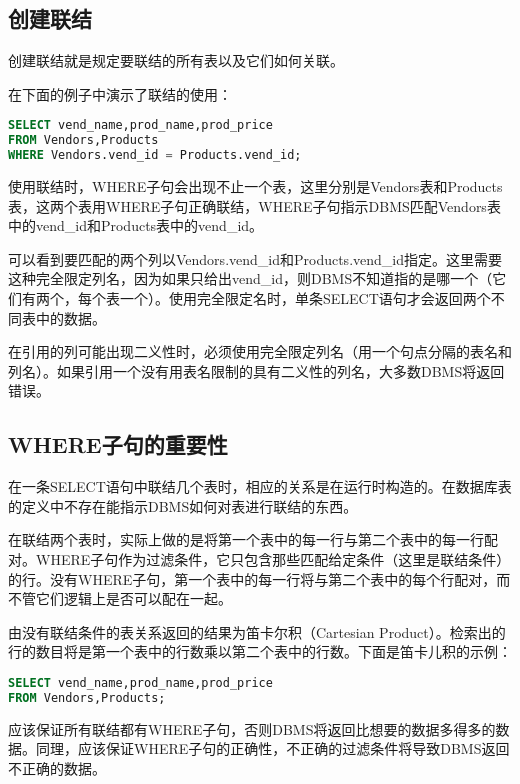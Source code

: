 \subsection{创建联结}

创建联结就是规定要联结的所有表以及它们如何关联。

在下面的例子中演示了联结的使用：

\begin{lstlisting}[language=SQL]
SELECT vend_name,prod_name,prod_price
FROM Vendors,Products
WHERE Vendors.vend_id = Products.vend_id;
\end{lstlisting}

使用联结时，WHERE子句会出现不止一个表，这里分别是Vendors表和Products表，这两个表用WHERE子句正确联结，WHERE子句指示DBMS匹配Vendors表中的vend\_id和Products表中的vend\_id。

可以看到要匹配的两个列以Vendors.vend\_id和Products.vend\_id指定。这里需要这种完全限定列名，因为如果只给出vend\_id，则DBMS不知道指的是哪一个（它们有两个，每个表一个）。使用完全限定名时，单条SELECT语句才会返回两个不同表中的数据。

在引用的列可能出现二义性时，必须使用完全限定列名（用一个句点分隔的表名和列名）。如果引用一个没有用表名限制的具有二义性的列名，大多数DBMS将返回错误。

\subsection{WHERE子句的重要性}

在一条SELECT语句中联结几个表时，相应的关系是在运行时构造的。在数据库表的定义中不存在能指示DBMS如何对表进行联结的东西。

在联结两个表时，实际上做的是将第一个表中的每一行与第二个表中的每一行配对。WHERE子句作为过滤条件，它只包含那些匹配给定条件（这里是联结条件）的行。没有WHERE子句，第一个表中的每一行将与第二个表中的每个行配对，而不管它们逻辑上是否可以配在一起。

由没有联结条件的表关系返回的结果为笛卡尔积（Cartesian Product）。检索出的行的数目将是第一个表中的行数乘以第二个表中的行数。下面是笛卡儿积的示例：

\begin{lstlisting}[language=SQL]
SELECT vend_name,prod_name,prod_price
FROM Vendors,Products;
\end{lstlisting}

应该保证所有联结都有WHERE子句，否则DBMS将返回比想要的数据多得多的数据。同理，应该保证WHERE子句的正确性，不正确的过滤条件将导致DBMS返回不正确的数据。

